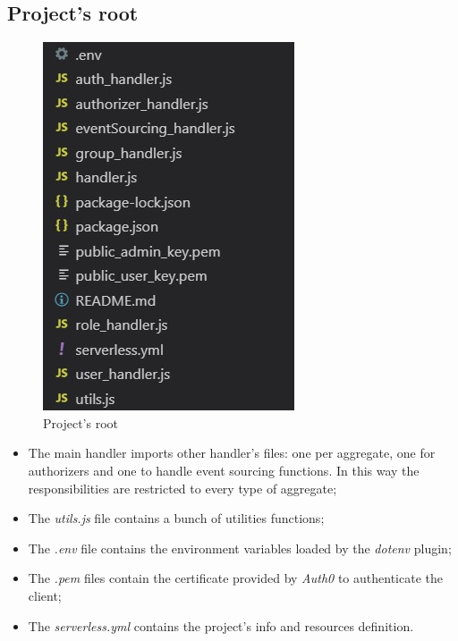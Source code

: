 \subsection{Project's root}
\begin{figure} [H]
	\centering
	\includegraphics[scale=1.2]{../Img/root}
	\caption{Project's root}\label{}
\end{figure}
\begin{itemize}
	\item The main handler imports other handler's files: one per aggregate, one for authorizers and one to handle event sourcing functions. In this way the responsibilities are restricted to every type of aggregate;
	\item The \emph{utils.js} file contains a bunch of utilities functions; 
	\item The \emph{.env} file contains the environment variables loaded by the \emph{dotenv} plugin;
	\item The \emph{.pem} files contain the certificate provided by \emph{Auth0} to authenticate the client;
	\item The \emph{serverless.yml} contains the project's info and resources definition.
\end{itemize}
